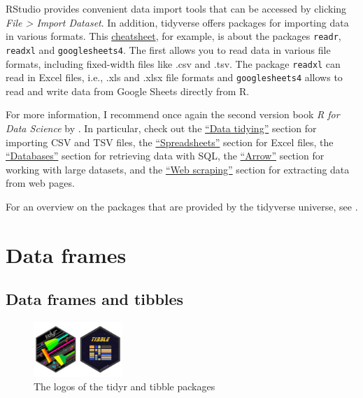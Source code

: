 \documentclass[
  12pt,
  oneside]{book}
\theoremstyle{definition}
\theoremstyle{definition}
\theoremstyle{definition}
\theoremstyle{definition}
\theoremstyle{remark}
\begin{document}
RStudio provides convenient data import tools that can be accessed by clicking \emph{File \textgreater{} Import Dataset}. In addition, tidyverse offers packages for importing data in various formats. This \href{https://posit.co/wp-content/uploads/2022/10/data-import.pdf}{cheatsheet}, for example, is about the packages \texttt{readr}, \texttt{readxl} and \texttt{googlesheets4}. The first allows you to read data in various file formats, including fixed-width files like .csv and .tsv. The package \texttt{readxl} can read in Excel files, i.e., .xls and .xlsx file formats and \texttt{googlesheets4} allows to read and write data from Google Sheets directly from R.

For more information, I recommend once again the second version book \emph{R for Data Science} by \href{https://r4ds.hadley.nz/}{\citet{Wickham2023R}}. In particular, check out the \href{https://r4ds.hadley.nz/data-tidy.html}{``Data tidying''} section for importing CSV and TSV files, the \href{https://r4ds.hadley.nz/spreadsheets.html}{``Spreadsheets''} section for Excel files, the \href{https://r4ds.hadley.nz/databases.html}{``Databases''} section for retrieving data with SQL, the \href{https://r4ds.hadley.nz/arrow.html}{``Arrow''} section for working with large datasets, and the \href{https://r4ds.hadley.nz/webscraping.html}{``Web scraping''} section for extracting data from web pages.

For an overview on the packages that are provided by the tidyverse universe, see \href{https://www.tidyverse.org/packages/\#import}{}.

\hypertarget{sec:tidy}{%
\section{Data frames}\label{sec:tidy}}

\hypertarget{data-frames-and-tibbles}{%
\subsection{Data frames and tibbles}\label{data-frames-and-tibbles}}

\begin{figure}
\centering
\includegraphics[width=0.3\textwidth,height=\textheight]{fig/tidyr-tibble-logo.png}
\caption{\label{fig:tidyr-tibble-logo} The logos of the tidyr and tibble packages}
\end{figure}
\end{document}
